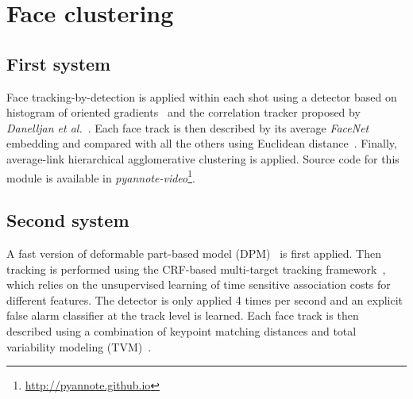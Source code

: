 \section{Face clustering}
\label{sec:face_clustering}

\subsection{First system}

Face tracking-by-detection is applied within each shot using a detector based on histogram of oriented gradients~\cite{Dalal2005} and the correlation tracker proposed by \emph{Danelljan et al.}~\cite{Danelljan2014}. Each face track is then described by its average \emph{FaceNet} embedding and compared with all the others using Euclidean distance~\cite{Schroff2015}. Finally, average-link hierarchical agglomerative clustering is applied. Source code for this module is available in \emph{pyannote-video}\footnote{\url{http://pyannote.github.io}}.

\subsection{Second system}

A fast version of deformable part-based model (DPM)~\cite{felzenszwalb2010dpm,mathias2014face,dubout2013deformable} is first applied. Then tracking is performed using the CRF-based multi-target tracking framework~\cite{heili2014tracking}, which relies on the unsupervised learning of time sensitive association costs for different features.
%
The detector is only applied 4 times per second and an explicit false alarm classifier at the track level is learned\cite{Le_ICPR_2016}.
%
Each face track is then described using a combination of keypoint matching distances and total variability modeling (TVM)~\cite{wallace2011inter,wallace2012total,Khoury:ICMR:2013}.

\endinput
